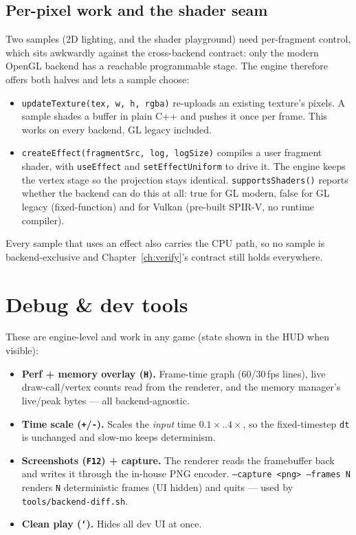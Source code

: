 \documentclass[11pt]{report}
\newcommand{\code}[1]{\texttt{#1}}
\begin{document}
\section{Per-pixel work and the shader seam}
Two samples (2D lighting, and the shader playground) need per-fragment control,
which sits awkwardly against the cross-backend contract: only the modern OpenGL
backend has a reachable programmable stage. The engine therefore offers both
halves and lets a sample choose:

\begin{itemize}[nosep]
  \item \code{updateTexture(tex, w, h, rgba)} re-uploads an existing texture's
        pixels. A sample shades a buffer in plain C++ and pushes it once per
        frame. This works on every backend, GL legacy included.
  \item \code{createEffect(fragmentSrc, log, logSize)} compiles a user fragment
        shader, with \code{useEffect} and \code{setEffectUniform} to drive it.
        The engine keeps the vertex stage so the projection stays identical.
        \code{supportsShaders()} reports whether the backend can do this at all:
        true for GL modern, false for GL legacy (fixed-function) and for Vulkan
        (pre-built SPIR-V, no runtime compiler).
\end{itemize}

Every sample that uses an effect also carries the CPU path, so no sample is
backend-exclusive and Chapter~\ref{ch:verify}'s contract still holds everywhere.

\chapter{Debug \& dev tools}
These are engine-level and work in any game (state shown in the HUD when visible):
\begin{itemize}[nosep]
  \item \textbf{Perf + memory overlay (\code{H}).} Frame-time graph (60/30\,fps
        lines), live draw-call/vertex counts read from the renderer, and the
        memory manager's live/peak bytes --- all backend-agnostic.
  \item \textbf{Time scale (\code{+}/\code{-}).} Scales the \emph{input} time
        $0.1\times$..$4\times$, so the fixed-timestep \code{dt} is unchanged and
        slow-mo keeps determinism.
  \item \textbf{Screenshots (\code{F12}) + capture.} The renderer reads the
        framebuffer back and writes it through the in-house PNG encoder.
        \code{--capture <png> --frames N} renders \code{N} deterministic frames
        (UI hidden) and quits --- used by \code{tools/backend-diff.sh}.
  \item \textbf{Clean play (\code{`}).} Hides all dev UI at once.
\end{itemize}
\end{document}
